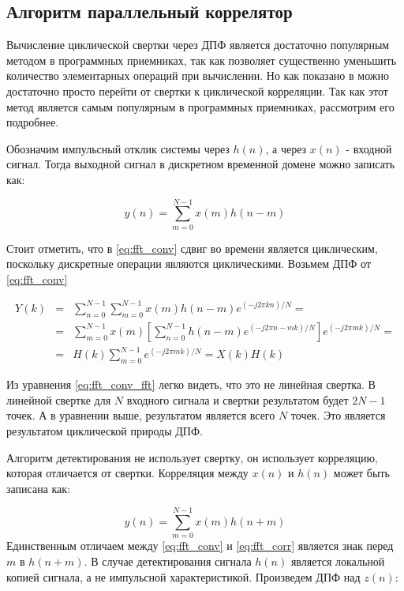 \subsection{Алгоритм параллельный коррелятор}
\label{sec1_fft}

Вычисление циклической свертки через ДПФ является достаточно популярным методом в программных приемниках, так как позволяет существенно 
уменьшить количество элементарных операций при вычислении. Но как показано в \cite{tsui, oppenheim} можно достаточно просто
перейти от свертки к циклической корреляции. Так как этот метод является самым популярным в программных приемниках, рассмотрим его
подробнее.

Обозначим импульсный отклик системы через $h(n)$, а через ${x(n)}$ - входной сигнал. Тогда выходной сигнал в дискретном
временной домене можно записать как:

\begin{equation}
	\label{eq:fft_conv}
	y(n)=\sum\limits_{m=0}^{N-1}{x(m)h(n-m)}
\end{equation}

Стоит отметить, что в \ref{eq:fft_conv} сдвиг во времени является циклическим, поскольку дискретные операции являются циклическими.
Возьмем ДПФ от \ref{eq:fft_conv}

\begin{center}
\begin{eqnarray}
	\label{eq:fft_conv_fft}
	Y(k) & = & \sum\limits_{n=0}^{N-1}\sum\limits_{m=0}^{N-1}{x(m)h(n-m)e^{(-j2\pi{kn})/N}}=\nonumber \\
	& = & \sum\limits_{m=0}^{N-1}{x(m)}[\sum\limits_{n=0}^{N-1}h(n-m)e^{(-j2\pi{n-m}k)/N}]e^{(-j2\pi{m}k)/N}=\\
	& = & H(k)\sum\limits_{m=0}^{N-1}e^{(-j2\pi{m}k)/N} = X(k)H(k)\nonumber 
\end{eqnarray}
\end{center}


Из уравнения \ref{eq:fft_conv_fft} легко видеть, что это не линейная свертка. В линейной свертке для $N$ входного
сигнала и свертки результатом будет $2N-1$ точек. А в уравнении выше, результатом является всего $N$ точек.
Это является результатом циклической природы ДПФ.

Алгоритм детектирования не использует свертку, он использует корреляцию, которая отличается от свертки. Корреляция
между $x(n)$ и $h(n)$ может быть записана как:

\begin{equation}
	\label{eq:fft_corr}
	y(n) = \sum\limits_{m=0}^{N-1}{x(m)h(n+m)}
\end{equation}
Единственным отличаем между \ref{eq:fft_conv} и \ref{eq:fft_corr} является знак перед $m$ в ${h(n+m)}$.
В случае детектирования сигнала $h(n)$ является локальной копией сигнала, а не импульсной характеристикой.
Произведем ДПФ над $z(n)$:

